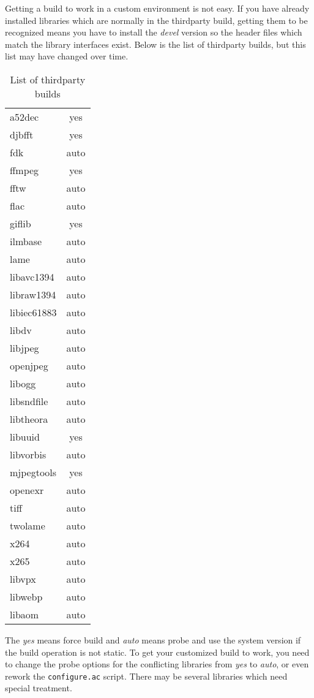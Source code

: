 Getting a build to work in a custom environment is not easy.  If you have already installed libraries which are normally in the thirdparty build, getting them to be recognized means you have to install the \textit{devel} version so the header files which match the library interfaces exist.  Below is the list of thirdparty builds, but this list may have changed over time.

\begin{table}[htpb]
    \centering
    \caption{List of thirdparty builds}
    \label{tab:List_of_thirdparty_builds}
        \small
    \begin{tabular}{m{8em}c}
        \toprule
 	a52dec   & yes\\
 	djbfft   & yes\\
	fdk      & auto\\
 	ffmpeg   & yes\\
 	fftw     & auto\\
 	flac     & auto\\
 	giflib   & yes\\
 	ilmbase&auto\\
 	lame    &  auto\\
 	libavc1394&auto\\
 	libraw1394&auto\\
 	libiec61883&auto\\
	libdv     &auto\\
 	libjpeg   &auto\\
 	openjpeg  &auto\\
 	libogg    &auto\\
 	libsndfile&auto\\
 	libtheora&auto\\
 	libuuid  & yes\\
 	libvorbis&auto\\
 	mjpegtools&yes\\
 	openexr   &auto\\
	tiff      &auto\\
 	twolame   &auto\\
 	x264      &auto\\
 	x265      &auto\\
 	libvpx	&auto\\
	libwebp&auto\\
	libaom&	auto\\
    \bottomrule
    \end{tabular}
\end{table}


The \textit{yes} means force build and \textit{auto} means probe and use the system version if the build operation is not static.  
To get your customized build to work, you need to change the probe options for the conflicting libraries from \textit{yes} to \textit{auto}, or even rework the \texttt{configure.ac} script.  
There may be several libraries which need special treatment.

